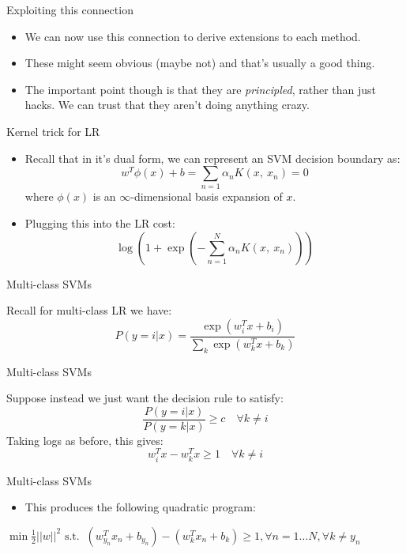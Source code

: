\documentclass[12pt,notes,mathserif]{beamer}
\providecommand{\tightlist}{%
	\setlength{\itemsep}{0pt}\setlength{\parskip}{0pt}}
\begin{document}
\begin{frame}{Exploiting this connection}

\begin{itemize}
\item
  We can now use this connection to derive extensions to each method.
\item
  These might seem obvious (maybe not) and that's usually a good thing.
\item
  The important point though is that they are \emph{principled}, rather
  than just hacks. We can trust that they aren't doing anything crazy.
\end{itemize}

\end{frame}

\begin{frame}{Kernel trick for LR}

\begin{itemize}
\item
  Recall that in it's dual form, we can represent an SVM decision
  boundary as: \[
  w^{T}\phi(x)+b=\sum_{n=1}\alpha_{n}K(x,\ x_{n})=0
  \] where \(\phi(x)\) is an \(\infty\)-dimensional basis expansion of
  \(x.\)
\item
  Plugging this into the LR cost: \[
  \log(1+\exp(-\sum_{n=1}^{N}\alpha_{n}K(x,\ x_{n})))
  \]
\end{itemize}

\end{frame}

\begin{frame}{Multi-class SVMs}

Recall for multi-class LR we have: \[
P(y=i|x)=\frac{\exp(w_{i}^{T}x+b_{i})}{\sum_{k}\exp(w_{k}^{T}x+b_{k})}
\]

\end{frame}

\begin{frame}{Multi-class SVMs}

Suppose instead we just want the decision rule to satisfy: \[
\frac{P(y=i|x)}{P(y=k|x)}\geq c \quad \forall k\neq i
\] Taking logs as before, this gives: \[
w_{i}^{T}x-w_{k}^{T}x\geq 1 \quad \forall k\neq i
\]

\end{frame}

\begin{frame}{Multi-class SVMs}

\begin{itemize}
\tightlist
\item
  This produces the following quadratic program:
\end{itemize}

\(\displaystyle \min \displaystyle \frac{1}{2}||w||^{2}\)
\(\textrm{s.t. }\ (w_{y_{n}}^{T}x_{n}+b_{y_{n}})-(w_{k}^{T}x_{n}+b_{k})\geq 1, \forall n=1\ldots N, \forall k\neq y_{n}\)

\end{frame}
\end{document}
